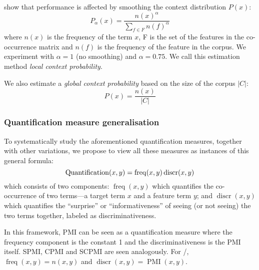  show that performance is affected by smoothing the context distribution $P(x)$:
%
\begin{equation}
  \label{eq:cds}
  P_{\alpha}(x) = \frac{n(x)^{\alpha}}{\sum_{f \in F}n(f)^{\alpha}}
\end{equation}
where $n(x)$ is the frequency of the term $x$, F is the set of the features in the co-occurrence matrix and $n(f)$ is the frequency of the feature in the corpus. We experiment with $\alpha=1$ (no smoothing) and $\alpha = 0.75$. We call this estimation method \emph{local context probability}.

We also estimate a \emph{global context probability} based on the size of the corpus $|C|$:
%
\begin{equation}
  \label{eq:cds-nan}
  P(x) = \frac{n(x)}{|C|}
\end{equation}

\subsubsection{Quantification measure generalisation}
\label{sec:quantification-measures}

To systematically study the aforementioned quantification measures, together with other variations, we propose to view all these measures as instances of this general formula:
%
\begin{equation}
  \small
  \label{eq:association}
  \operatorname{Quantification}(x,y) = \operatorname{freq}(x, y)
                                       \operatorname{discr}(x, y)
\end{equation}
%
which consists of two components: $\operatorname{freq}(x, y)$ which quantifies the co-occurrence of two terms---a target term $x$ and a feature term $y$; and $\operatorname{discr}(x, y)$ which quantifies the ``surprise'' or ``informativeness'' of seeing (or not seeing) the two terms together, labeled as discriminativeness.

In this framework, PMI can be seen as a quantification measure where the frequency component is the constant 1 and the discriminativeness is the PMI itself. SPMI, CPMI and SCPMI are seen analogously. For \NPMI/, $\operatorname{freq}(x, y) = n(x, y)$ and $\operatorname{discr}(x, y) = \operatorname{PMI}(x, y)$.

